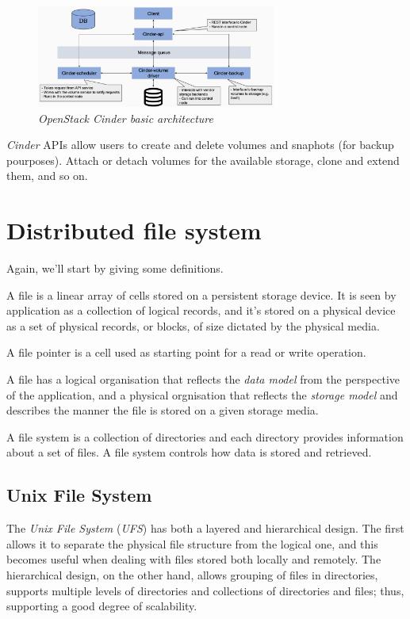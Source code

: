 \begin{figure}[h!]
    \centering
    \includegraphics[width=0.7\textwidth]{images/block-model-cinder.png}
    \caption{\emph{OpenStack Cinder basic architecture}}
\end{figure}

\noindent
\emph{Cinder} APIs allow users to create and delete volumes and snaphots (for
backup pourposes). Attach or detach volumes for the available storage, clone and
extend them, and so on.

\section{Distributed file system}
Again, we'll start by giving some definitions.

\begin{definition}[File]
    A file is a linear array of cells stored on a persistent storage device. It
    is seen by application as a collection of logical records, and it's stored
    on a physical device as a set of physical records, or blocks, of size
    dictated by the physical media.
\end{definition}
\begin{definition}
    A file pointer is a cell used as starting point for a read or write operation.
\end{definition}

\noindent
A file has a logical organisation that reflects the \emph{data model} from the
perspective of the application, and a physical orgnisation that reflects the
\emph{storage model} and describes the manner the file is stored on a given
storage media.

\begin{definition}
    A file system is a collection of directories and each directory provides
    information about a set of files. A file system controls how data is stored
    and retrieved.
\end{definition}

\subsection{Unix File System}
The \emph{Unix File System} (\emph{UFS}) has both a layered and hierarchical
design. The first allows it to separate the physical file structure from the
logical one, and this becomes useful when dealing with files stored both locally
and remotely. The hierarchical design, on the other hand, allows grouping of
files in directories, supports multiple levels of directories and collections of
directories and files; thus, supporting a good degree of scalability.


